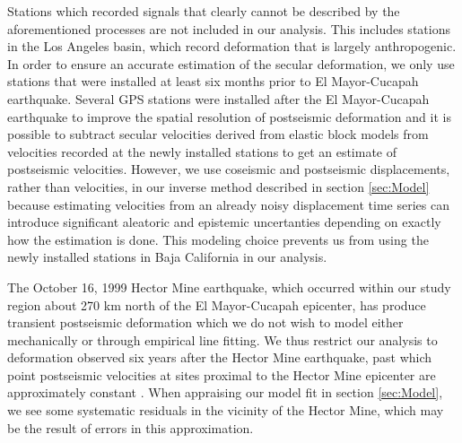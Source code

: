 \documentclass[12pt]{article}
\begin{document}
Stations which recorded signals that clearly cannot be described by the aforementioned processes are not included in our analysis. This includes stations in the Los Angeles basin, which record deformation that is largely anthropogenic. In order to ensure an accurate estimation of the secular deformation, we only use stations that were installed at least six months prior to El Mayor-Cucapah earthquake. Several GPS stations were installed after the El Mayor-Cucapah earthquake to improve the spatial resolution of postseismic deformation \citep{Spinler2015} and it is possible to subtract secular velocities derived from elastic block models \citep[e.g.][]{Meade2005} from velocities recorded at the newly installed stations to get an estimate of postseismic velocities. However, we use coseismic and postseismic displacements, rather than velocities, in our inverse method described in section \ref{sec:Model} because estimating velocities from an already noisy displacement time series can introduce significant aleatoric and epistemic uncertanties depending on exactly how the estimation is done. This modeling choice prevents us from using the newly installed stations in Baja California in our analysis.   

The October 16, 1999 Hector Mine earthquake, which occurred within our study region about 270 km north of the El Mayor-Cucapah epicenter, has produce transient postseismic deformation which we do not wish to model either mechanically or through empirical line fitting. We thus restrict our analysis to deformation observed six years after the Hector Mine earthquake, past which point postseismic velocities at sites proximal to the Hector Mine epicenter are approximately constant \citep{Savage2009}.  When appraising our model fit in section \ref{sec:Model}, we see some systematic residuals in the vicinity of the Hector Mine, which may be the result of errors in this approximation.   
\end{document}
